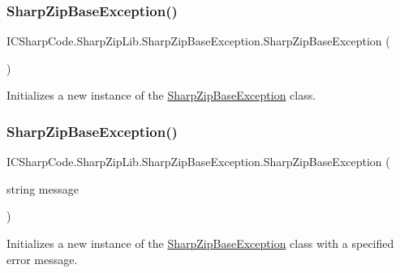 \subsubsection{\texorpdfstring{Sharp\+Zip\+Base\+Exception()}{SharpZipBaseException()}\hspace{0.1cm}{\footnotesize\ttfamily [2/8]}}
{\footnotesize\ttfamily I\+C\+Sharp\+Code.\+Sharp\+Zip\+Lib.\+Sharp\+Zip\+Base\+Exception.\+Sharp\+Zip\+Base\+Exception (\begin{DoxyParamCaption}{ }\end{DoxyParamCaption})\hspace{0.3cm}{\ttfamily [inline]}}



Initializes a new instance of the \hyperlink{class_i_c_sharp_code_1_1_sharp_zip_lib_1_1_sharp_zip_base_exception}{Sharp\+Zip\+Base\+Exception} class. 

\mbox{\label{class_i_c_sharp_code_1_1_sharp_zip_lib_1_1_sharp_zip_base_exception_aed7cfb9170371c9682040721aab44017}} 
\subsubsection{\texorpdfstring{Sharp\+Zip\+Base\+Exception()}{SharpZipBaseException()}\hspace{0.1cm}{\footnotesize\ttfamily [3/8]}}
{\footnotesize\ttfamily I\+C\+Sharp\+Code.\+Sharp\+Zip\+Lib.\+Sharp\+Zip\+Base\+Exception.\+Sharp\+Zip\+Base\+Exception (\begin{DoxyParamCaption}\item[{string}]{message }\end{DoxyParamCaption})\hspace{0.3cm}{\ttfamily [inline]}}



Initializes a new instance of the \hyperlink{class_i_c_sharp_code_1_1_sharp_zip_lib_1_1_sharp_zip_base_exception}{Sharp\+Zip\+Base\+Exception} class with a specified error message. 


